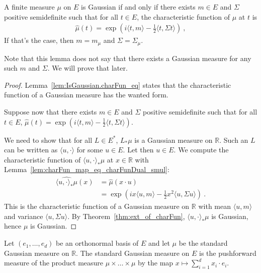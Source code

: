 \begin{lemma}\label{lem:isGaussian_iff_charFun_eq}
A finite measure $\mu$ on $E$ is Gaussian if and only if there exists $m \in E$ and $\Sigma$ positive semidefinite such that for all $t \in E$, the characteristic function of $\mu$ at $t$ is
\begin{align*}
  \hat{\mu}(t) = \exp\left(i \langle t, m \rangle - \frac{1}{2} \langle t, \Sigma t \rangle\right) \: ,
\end{align*}
If that's the case, then $m = m_\mu$ and $\Sigma = \Sigma_\mu$.
\end{lemma}

Note that this lemma does not say that there exists a Gaussian measure for any such $m$ and $\Sigma$.
We will prove that later.

\begin{proof}
Lemma~\ref{lem:IsGaussian.charFun_eq} states that the characteristic function of a Gaussian measure has the wanted form.

Suppose now that there exists $m \in E$ and $\Sigma$ positive semidefinite such that for all $t \in E$, $\hat{\mu}(t) = \exp\left(i \langle t, m \rangle - \frac{1}{2} \langle t, \Sigma t \rangle\right)$.

We need to show that for all $L \in E^*$, $L_*\mu$ is a Gaussian measure on $\mathbb{R}$.
Such an $L$ can be written as $\langle u, \cdot \rangle$ for some $u \in E$.
Let then $u \in E$. We compute the characteristic function of $\langle u, \cdot\rangle_*\mu$ at $x \in \mathbb{R}$ with Lemma~\ref{lem:charFun_map_eq_charFunDual_smul}:
\begin{align*}
  \widehat{\langle u, \cdot\rangle_*\mu}(x)
  &= \hat{\mu}(x \cdot u)
  \\
  &= \exp\left(i x \langle u, m \rangle - \frac{1}{2} x^2 \langle u, \Sigma u \rangle\right)
  \: .
\end{align*}
This is the characteristic function of a Gaussian measure on $\mathbb{R}$ with mean $\langle u, m \rangle$ and variance $\langle u, \Sigma u \rangle$.
By Theorem~\ref{thm:ext_of_charFun}, $\langle u, \cdot\rangle_*\mu$ is Gaussian, hence $\mu$ is Gaussian.
\end{proof}


\begin{definition}\label{def:stdGaussian}
  \leanok
Let $(e_1, \ldots, e_d)$ be an orthonormal basis of $E$ and let $\mu$ be the standard Gaussian measure on $\mathbb{R}$.
The standard Gaussian measure on $E$ is the pushforward measure of the product measure $\mu \times \ldots \times \mu$ by the map $x \mapsto \sum_{i=1}^d x_i \cdot e_i$.
\end{definition}

